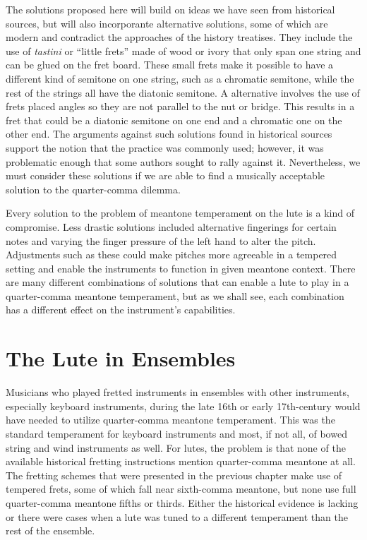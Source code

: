 The solutions proposed here will build on ideas we have seen from historical sources,
but will also incorporante alternative solutions, some of which are modern and
contradict the approaches of the history treatises. They include the use of
\textit{tastini} or ``little frets'' made of wood or ivory that only span one string
and can be glued on the fret board.  These small frets make it possible to have a
different kind of semitone on one string, such as a chromatic semitone, while the rest
of the strings all have the diatonic semitone.  A alternative involves the use of frets
placed angles so they are not parallel to the nut or bridge.  This results in a fret
that could be a diatonic semitone on one end and a chromatic one on the other end.  The
arguments against such solutions found in historical sources support the notion that
the practice was commonly used; however, it was problematic enough that some authors
sought to rally against it. Nevertheless, we must consider these solutions if we are
able to find a musically acceptable solution to the quarter-comma dilemma.

Every solution to the problem of meantone temperament on the lute is a kind of
compromise.  Less drastic solutions included alternative fingerings for certain notes
and varying the finger pressure of the left hand to alter the pitch.  Adjustments such
as these could make pitches more agreeable in a tempered setting and enable the
instruments to function in given meantone context.  There are many different
combinations of solutions that can enable a lute to play in a quarter-comma meantone
temperament, but as we shall see, each combination has a different effect on the
instrument's capabilities.

\section{The Lute in Ensembles}

Musicians who played fretted instruments in ensembles with other instruments,
especially keyboard instruments, during the late 16th or early 17th-century would have
needed to utilize quarter-comma meantone temperament.  This was the standard
temperament for keyboard instruments and most, if not all, of bowed string and wind
instruments as well. For lutes, the problem is that none of the available historical
fretting instructions mention quarter-comma meantone at all.  The fretting schemes that
were presented in the previous chapter make use of tempered frets, some of which fall
near sixth-comma meantone, but none use full quarter-comma meantone fifths or thirds.
Either the historical evidence is lacking or there were cases when a lute was tuned to a
different temperament than the rest of the ensemble.

